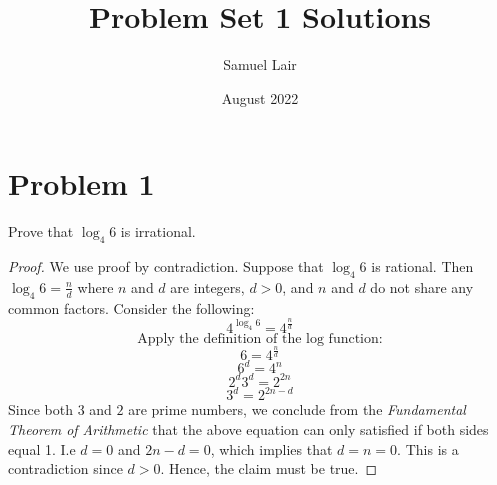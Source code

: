 \documentclass{article}
\title{Problem Set 1 Solutions}
\author{Samuel Lair}
\date{August 2022}
\begin{document}
\maketitle
\tableofcontents

\pagebreak

\section{Problem 1}
Prove that $\log_4 6$ is irrational.
\begin{proof}
	We use proof by contradiction. Suppose that $\log_4 6$ is rational. Then $\log_4 6 = \frac{n}{d}$ where $n$ and $d$ are integers, $d > 0$, and $n$ and $d$ do not share any common factors. Consider the following:
	\[
		4^{\log_4 6} = 4^{\frac{n}{d}}
	\]
	\[
		\text{Apply the definition of the log function:}
	\]
	\[
		6 = 4^{\frac{n}{d}}
	\]
	\[
		6^d = 4^n
	\]
	\[
		2^d 3^d = 2^{2n}
	\]
	\[
		3^d = 2^{2n - d}
	\]
	Since both $3$ and $2$ are prime numbers, we conclude from the \textit{Fundamental Theorem of Arithmetic} that the above equation can only satisfied if both sides equal 1. I.e $d = 0$ and $2n - d = 0$, which implies that $d = n = 0$.  This is a contradiction since $d > 0$. Hence, the claim must be true.
\end{proof}

\pagebreak
\end{document}
